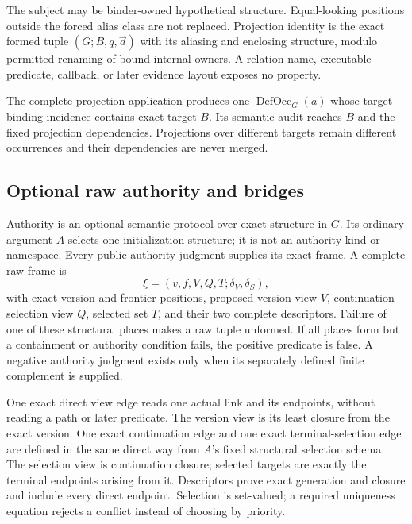 \documentclass[11pt,twoside]{article}
\begin{document}
The subject may be binder-owned hypothetical structure.  Equal-looking positions
outside the forced alias class are not replaced.  Projection identity is the exact
formed tuple \((G;B,q,\vec a)\) with its aliasing and enclosing structure, modulo
permitted renaming of bound internal owners.  A relation name, executable predicate,
callback, or later evidence layout exposes no property.

The complete projection application produces one
\(\operatorname{DefOcc}_G(a)\) whose target-binding incidence contains exact target
\(B\).  Its semantic audit reaches \(B\) and the fixed projection dependencies.
Projections over different targets remain different occurrences and their
dependencies are never merged.

\subsection{Optional raw authority and bridges}\label{sec:authority}

Authority is an optional semantic protocol over exact structure in \(G\).  Its
ordinary argument \(A\) selects one initialization structure; it is not an
authority kind or namespace.  Every public authority judgment supplies its exact
frame.  A complete raw frame is
\[
  \xi=(v,f,V,Q,T;\delta_V,\delta_S),
\]
with exact version and frontier positions, proposed version view \(V\),
continuation-selection view \(Q\), selected set \(T\), and their two complete
descriptors.  Failure of one of these structural places makes a raw tuple
unformed.  If all places form but a containment or authority condition fails, the
positive predicate is false.  A negative authority judgment exists only when its
separately defined finite complement is supplied.

One exact direct view edge reads one actual link and its endpoints, without reading
a path or later predicate.  The version view is its least closure from the exact
version.  One exact continuation edge and one exact terminal-selection edge are
defined in the same direct way from \(A\)'s fixed structural selection schema.
The selection view is continuation closure; selected targets are exactly the
terminal endpoints arising from it.  Descriptors prove exact generation and
closure and include every direct endpoint.  Selection is set-valued; a required
uniqueness equation rejects a conflict instead of choosing by priority.
\end{document}
